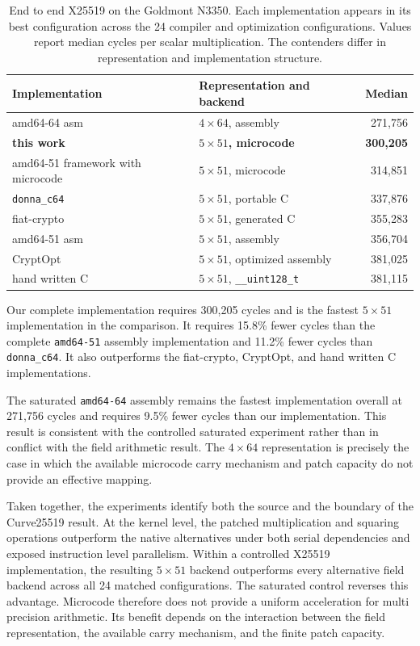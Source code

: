 \documentclass[journal=tches,submission]{iacrtrans}
\newcommand{\code}[1]{\texttt{#1}}
\begin{document}
\begin{table}[htbp]
\centering
\caption{End to end X25519 on the Goldmont N3350.
Each implementation appears in its best configuration across the 24 compiler and optimization configurations.
Values report median cycles per scalar multiplication.
The contenders differ in representation and implementation structure.}
\label{tab:res-c25519-e2e}
\footnotesize
\setlength{\tabcolsep}{4pt}
\begin{tabular}{@{}llr@{}}
\toprule
Implementation & Representation and backend & Median \\
\midrule
amd64-64 asm &
$4\times64$, assembly &
271,756 \\
\textbf{this work} &
\textbf{$5\times51$, microcode} &
\textbf{300,205} \\
amd64-51 framework with microcode &
$5\times51$, microcode &
314,851 \\
\code{donna\_c64} &
$5\times51$, portable C &
337,876 \\
fiat-crypto &
$5\times51$, generated C &
355,283 \\
amd64-51 asm &
$5\times51$, assembly &
356,704 \\
CryptOpt &
$5\times51$, optimized assembly &
381,025 \\
hand written C &
$5\times51$, \code{\_\_uint128\_t} &
381,115 \\
\bottomrule
\end{tabular}
\end{table}

Our complete implementation requires 300,205 cycles and is the fastest $5\times51$ implementation in the comparison.
It requires 15.8\% fewer cycles than the complete \texttt{amd64-51} assembly implementation and 11.2\% fewer cycles than \texttt{donna\_c64}.
It also outperforms the fiat-crypto, CryptOpt, and hand written C implementations.

The saturated \texttt{amd64-64} assembly remains the fastest implementation overall at 271,756 cycles and requires 9.5\% fewer cycles than our implementation.
This result is consistent with the controlled saturated experiment rather than in conflict with the field arithmetic result.
The $4\times64$ representation is precisely the case in which the available microcode carry mechanism and patch capacity do not provide an effective mapping.

Taken together, the experiments identify both the source and the boundary of the Curve25519 result.
At the kernel level, the patched multiplication and squaring operations outperform the native alternatives under both serial dependencies and exposed instruction level parallelism.
Within a controlled X25519 implementation, the resulting $5\times51$ backend outperforms every alternative field backend across all 24 matched configurations.
The saturated control reverses this advantage.
Microcode therefore does not provide a uniform acceleration for multi precision arithmetic.
Its benefit depends on the interaction between the field representation, the available carry mechanism, and the finite patch capacity.
\end{document}
